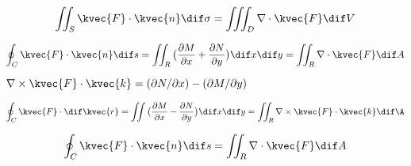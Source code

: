 \begin{align*}
\iint_S \kvec{F} \cdot \kvec{n} \dif \sigma = \iiint_D \nabla \cdot \kvec{F} \dif V
\end{align*}

\begin{align*}
\oint_C \kvec{F} \cdot \kvec{n} \dif s = \iint_R \big( \frac{\partial M}{\partial x} + \frac{\partial N}{\partial y} \big) \dif x \dif y = \iint_R \nabla \cdot \kvec{F} \dif A
\end{align*}

\( \nabla \times \kvec{F} \cdot \kvec{k} = ( \partial N / \partial x) - ( \partial M / \partial y) \) 


\begin{align*}
\oint_C \kvec{F} \cdot \dif \kvec{r} = \iint \big( \frac{\partial M}{\partial x} - \frac{\partial N}{\partial y} \big) \dif x \dif y = \iint_R \nabla \times \kvec{F} \cdot \kvec{k} \dif \A
\end{align*}

\begin{align*}
\oint_C \kvec{F} \cdot \kvec{n} \dif s = \iint_R \nabla \cdot \kvec{F} \dif A
\end{align*}















